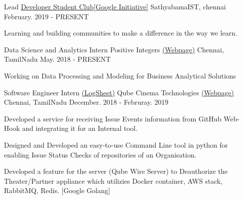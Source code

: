 

\begin{cventries}

  \cventry
    {Lead} %
    {\href{https://sites.google.com/view/sathyabamacodingclub}{Developer Student Club[Google Initiative]}} %
    {SathyabamaIST, chennai} %
    {February. 2019 - PRESENT} %
    {
      \begin{cvitems} %
        \item {Learning and building communities to make a difference in the way we learn.}
      \end{cvitems}
    }



  \cventry
    {Data Science and Analytics Intern}
    {Positive Integers \href{http://positiveintegers.com/}{(Webpage)}} %
    {Chennai, TamilNadu} %
    {May. 2018 - PRESENT} %
    {
      \begin{cvitems} %
        \item {Working on Data Processing and Modeling for Business Analytical Solutions}
      \end{cvitems}
    }
    
    
    
  \cventry
    {Software Engineer Intern \href{https://docs.google.com/spreadsheets/d/1dDO6C-KJg47RTLgM4caVn2qnPnrNxWdrVtkyauuFjb4/edit?usp=sharing}{(LogSheet)}} %
    {Qube Cinema Technologies \href{https://www.qubecinema.com/}{(Webpage)} } %
    {Chennai, TamilNadu} %
    {December. 2018 - Februray. 2019} %
    {
      \begin{cvitems} %
        \item {Developed a service for receiving Issue Events information from GitHub Web-Hook and integrating it for an Internal tool.}
        \item {Designed and Developed an easy-to-use Command Line tool in python for enabling Issue Status Checks of repositories of an Organisation.}
        \item {Developed a feature for the server (Qube Wire Server) to Deauthorize the Theater/Partner appliance which utilizies Docker container, AWS stack, RabbitMQ, Redis. [Google Golang]}
      \end{cvitems}
    }


\end{cventries}
